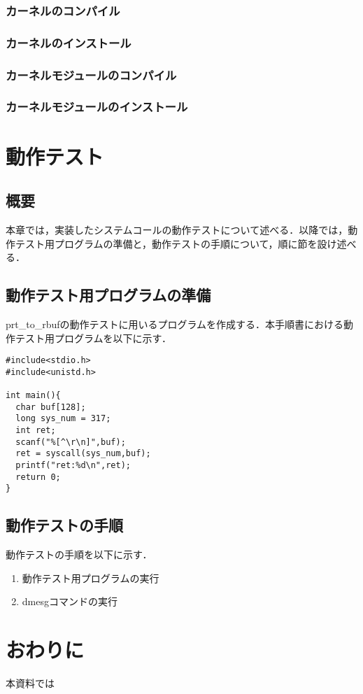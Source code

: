 \documentclass[12pt]{jsarticle}
\begin{document}
\subsubsection{カーネルのコンパイル}
\subsubsection{カーネルのインストール}
\subsubsection{カーネルモジュールのコンパイル}
\subsubsection{カーネルモジュールのインストール}
\section{動作テスト}
\subsection{概要}
本章では，実装したシステムコールの動作テストについて述べる．以降では，動作テスト用プログラムの準備と，動作テストの手順について，順に節を設け述べる．
\subsection{動作テスト用プログラムの準備}
prt\_to\_rbufの動作テストに用いるプログラムを作成する．本手順書における動作テスト用プログラムを以下に示す．
\begin{verbatim}
#include<stdio.h>
#include<unistd.h>

int main(){
  char buf[128];
  long sys_num = 317;
  int ret;
  scanf("%[^\r\n]",buf);
  ret = syscall(sys_num,buf);
  printf("ret:%d\n",ret);
  return 0;
}
\end{verbatim}
\subsection{動作テストの手順}
動作テストの手順を以下に示す．
\begin{enumerate}
\item 動作テスト用プログラムの実行
\item dmesgコマンドの実行
\end{enumerate}

\section{おわりに}

本資料では



\end{document}
